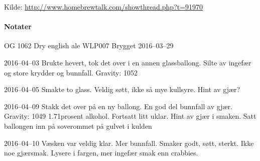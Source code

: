 Kilde: \url{http://www.homebrewtalk.com/showthread.php?t=91970}

\paragraph{Notater}

OG 1062
Dry english ale WLP007
Brygget 2016--03--29

2016--04--03
Brukte hevert, tok det over i en annen glassballong. Silte av ingefær og store krydder og bunnfall.
Gravity: 1052

2016--04--05
Smakte to glass. Veldig søtt, ikke så mye kullsyre. Hint av gjær?

2016--04--09
Stakk det over på en ny ballong. En god del bunnfall av gjær.
Gravity: 1049  1.71prosent alkohol.
Fortsatt litt uklar. Hint av gjær i smaken.
Satt ballongen inn på soverommet på gulvet i kulden

2016--04--10
Væsken var veldig klar. Mer bunnfall.
Smaker godt, søtt, sterkt. Ikke noe gjærsmak. Lysere i fargen, mer ingefær smak enn crabbies.
